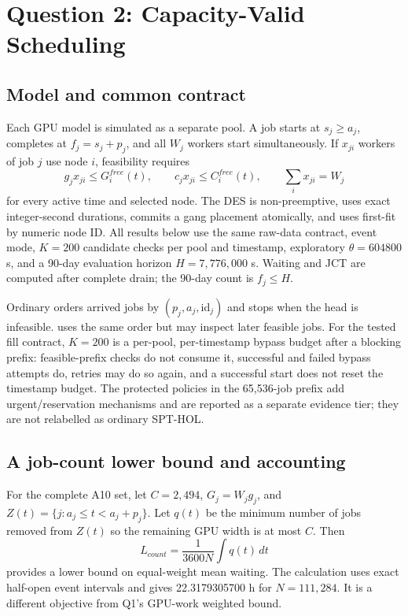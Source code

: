 \section{Question 2: Capacity-Valid Scheduling}
\label{sec:q2}
\subsection{Model and common contract}
Each GPU model is simulated as a separate pool. A job starts at $s_j\ge a_j$, completes at $f_j=s_j+p_j$, and all $W_j$ workers start simultaneously. If $x_{ji}$ workers of job $j$ use node $i$, feasibility requires
\begin{equation}
 g_jx_{ji}\le G_i^{free}(t),\qquad c_jx_{ji}\le C_i^{free}(t),\qquad \sum_i x_{ji}=W_j
\end{equation}
for every active time and selected node. The DES is non-preemptive, uses exact integer-second durations, commits a gang placement atomically, and uses first-fit by numeric node ID. All results below use the same raw-data contract,  event mode, $K=200$ candidate checks per pool and timestamp, exploratory $\theta=604800$ s, and a 90-day evaluation horizon $H=7,776,000$ s. Waiting and JCT are computed after complete drain; the 90-day count is $f_j\le H$.

Ordinary  orders arrived jobs by $(p_j,a_j,\mathrm{id}_j)$ and stops when the head is infeasible.  uses the same order but may inspect later feasible jobs. For the tested fill contract, $K=200$ is a per-pool, per-timestamp bypass budget after a blocking prefix: feasible-prefix checks do not consume it, successful and failed bypass attempts do, retries may do so again, and a successful start does not reset the timestamp budget. The protected policies in the 65,536-job prefix add urgent/reservation mechanisms and are reported as a separate evidence tier; they are not relabelled as ordinary SPT-HOL.

\subsection{A job-count lower bound and accounting}
For the complete A10 set, let $C=2,494$, $G_j=W_jg_j$, and $Z(t)=\{j:a_j\le t<a_j+p_j\}$. Let $q(t)$ be the minimum number of jobs removed from $Z(t)$ so the remaining GPU width is at most $C$. Then
\begin{equation}
 L_{count}=\frac{1}{3600N}\int q(t)\,dt
\end{equation}
provides a lower bound on equal-weight mean waiting. The calculation uses exact half-open event intervals and gives 22.3179305700 h for $N=111,284$. It is a different objective from Q1's GPU-work weighted bound.

